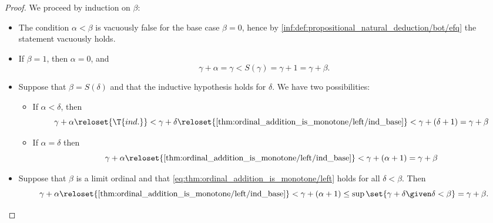 \begin{proof}
   We proceed by induction on \( \beta \):
  \begin{itemize}
    \item The condition \( \alpha < \beta \) is vacuously false for the base case \( \beta = 0 \), hence by \ref{inf:def:propositional_natural_deduction/bot/efq} the statement vacuously holds.

    \item If \( \beta = 1 \), then \( \alpha = 0 \), and
    \begin{equation}\label{thm:ordinal_addition_is_monotone/left/ind_base}
      \gamma + \alpha = \gamma < S(\gamma) = \gamma + 1 = \gamma + \beta.
    \end{equation}

    \item Suppose that \( \beta = S(\delta) \) and that the inductive hypothesis holds for \( \delta \). We have two possibilities:
    \begin{itemize}
      \item If \( \alpha < \delta \), then
      \begin{equation*}
        \gamma + \alpha
        \reloset {\T{ind.}} <
        \gamma + \delta
        \reloset {\eqref{thm:ordinal_addition_is_monotone/left/ind_base}} <
        \gamma + (\delta + 1)
        =
        \gamma + \beta
      \end{equation*}

      \item If \( \alpha = \delta \) then
      \begin{equation*}
        \gamma + \alpha
        \reloset {\eqref{thm:ordinal_addition_is_monotone/left/ind_base}} <
        \gamma + (\alpha + 1)
        =
        \gamma + \beta
      \end{equation*}
    \end{itemize}

    \item Suppose that \( \beta \) is a limit ordinal and that \eqref{eq:thm:ordinal_addition_is_monotone/left} holds for all \( \delta < \beta \). Then
    \begin{equation*}
      \gamma + \alpha
      \reloset {\eqref{thm:ordinal_addition_is_monotone/left/ind_base}} <
      \gamma + (\alpha + 1)
      \leq
      \sup\set{ \gamma + \delta \given \delta < \beta }
      =
      \gamma + \beta.
    \end{equation*}
  \end{itemize}


\end{proof}
